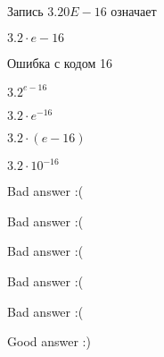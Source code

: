 
\begin{question}
Запись \(3.20E-16\) означает
\begin{answerlist}
  \item \(3.2\cdot e - 16\)
  \item Ошибка с кодом 16
  \item \(3.2^{e-16}\)
  \item \(3.2\cdot e^{-16}\)
  \item \(3.2\cdot (e - 16)\)
  \item \(3.2\cdot 10^{-16}\)
\end{answerlist}
\end{question}

\begin{solution}
\begin{answerlist}
  \item Bad answer :(
  \item Bad answer :(
  \item Bad answer :(
  \item Bad answer :(
  \item Bad answer :(
  \item Good answer :)
\end{answerlist}
\end{solution}

